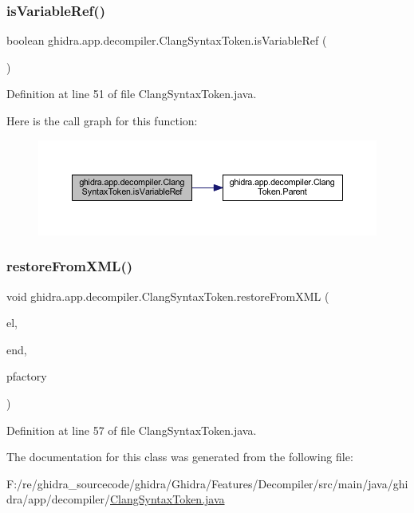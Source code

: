 \subsubsection{\texorpdfstring{isVariableRef()}{isVariableRef()}}
{\footnotesize\ttfamily boolean ghidra.\+app.\+decompiler.\+Clang\+Syntax\+Token.\+is\+Variable\+Ref (\begin{DoxyParamCaption}{ }\end{DoxyParamCaption})\hspace{0.3cm}{\ttfamily [inline]}}



Definition at line 51 of file Clang\+Syntax\+Token.\+java.

Here is the call graph for this function\+:
\nopagebreak
\begin{figure}[H]
\begin{center}
\leavevmode
\includegraphics[width=350pt]{classghidra_1_1app_1_1decompiler_1_1_clang_syntax_token_a10e5b7651f2b00e4d5daf4e04e2045f1_cgraph}
\end{center}
\end{figure}
\mbox{\label{classghidra_1_1app_1_1decompiler_1_1_clang_syntax_token_a60088d748fb3e9d541b8c999270700fd}} 
\subsubsection{\texorpdfstring{restoreFromXML()}{restoreFromXML()}}
{\footnotesize\ttfamily void ghidra.\+app.\+decompiler.\+Clang\+Syntax\+Token.\+restore\+From\+X\+ML (\begin{DoxyParamCaption}\item[{Xml\+Element}]{el,  }\item[{Xml\+Element}]{end,  }\item[{Pcode\+Factory}]{pfactory }\end{DoxyParamCaption})\hspace{0.3cm}{\ttfamily [inline]}}



Definition at line 57 of file Clang\+Syntax\+Token.\+java.



The documentation for this class was generated from the following file\+:\begin{DoxyCompactItemize}
\item 
F\+:/re/ghidra\+\_\+sourcecode/ghidra/\+Ghidra/\+Features/\+Decompiler/src/main/java/ghidra/app/decompiler/\mbox{\hyperlink{_clang_syntax_token_8java}{Clang\+Syntax\+Token.\+java}}\end{DoxyCompactItemize}
